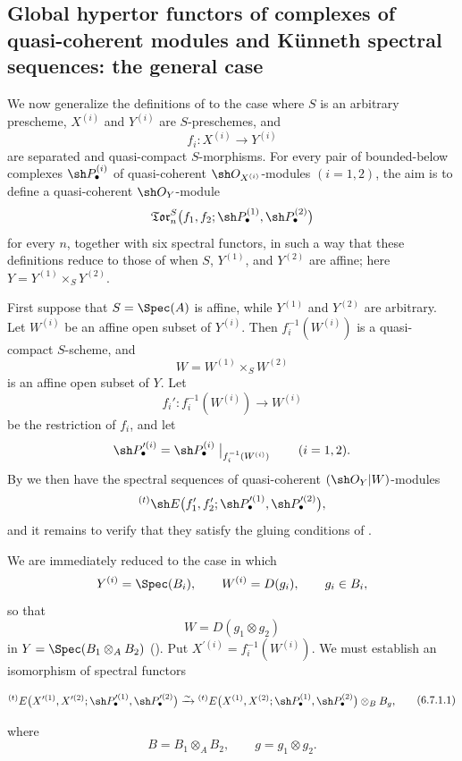 \subsection{Global hypertor functors of complexes of quasi-coherent modules and K\"unneth spectral sequences: the general case}
\label{subsection:III.6.7}

\begin{env}[6.7.1]
\label{III.6.7.1}
We now generalize the definitions of  to the
case where $S$ is an arbitrary prescheme, $X^{(i)}$ and
$Y^{(i)}$ are $S$-preschemes, and
\[
  f_i:X^{(i)}\longrightarrow Y^{(i)}
\]
are separated and quasi-compact $S$-morphisms.  For every pair
of bounded-below complexes $\sh P_\bullet^{(i)}$ of
quasi-coherent $\sh O_{X^{(i)}}$-modules $(i=1,2)$, the aim is to
define a quasi-coherent $\sh O_Y$-module
\[
  \mathfrak{Tor}_n^S
  \bigl(
    f_1,f_2;
    \sh P_\bullet^{(1)},\sh P_\bullet^{(2)}
  \bigr)
\]
for every $n$, together with six spectral functors, in such a way
that these definitions reduce to those of  when
$S$, $Y^{(1)}$, and $Y^{(2)}$ are affine; here
$Y=Y^{(1)}\times_SY^{(2)}$.

First suppose that $S=\Spec(A)$ is affine, while $Y^{(1)}$ and
$Y^{(2)}$ are arbitrary.  Let $W^{(i)}$ be an affine open subset
of $Y^{(i)}$.  Then $f_i^{-1}(W^{(i)})$ is a quasi-compact
$S$-scheme, and
\[
  W=W^{(1)}\times_SW^{(2)}
\]
is an affine open subset of $Y$.  Let
\[
  f_i':f_i^{-1}(W^{(i)})\longrightarrow W^{(i)}
\]
be the restriction of $f_i$, and let
\[
  \sh P_\bullet^{\prime(i)}
  =
  \sh P_\bullet^{(i)}
  \bigm|_{f_i^{-1}(W^{(i)})}
  \qquad(i=1,2).
\]
By  we then have the spectral sequences of
quasi-coherent $(\sh O_Y|W)$-modules
\[
  {}^{(t)}\sh E
  \bigl(
    f_1',f_2';
    \sh P_\bullet^{\prime(1)},\sh P_\bullet^{\prime(2)}
  \bigr),
\]
and it remains to verify that they satisfy the gluing conditions
of .

We are immediately reduced to the case in which
\[
  Y^{(i)}=\Spec(B_i),
  \qquad
  W^{(i)}=D(g_i),
  \qquad g_i\in B_i,
\]
so that
\[
  W=D(g_1\otimes g_2)
\]
in $Y=\Spec(B_1\otimes_AB_2)$
().  Put
$X^{\prime(i)}=f_i^{-1}(W^{(i)})$.  We must establish an
isomorphism of spectral functors
\begin{env}[6.7.1.1]
\label{III.6.7.1.1}
\[
\begin{split}
  {}^{(t)}E
  \bigl(
    X^{\prime(1)},X^{\prime(2)};
    \sh P_\bullet^{\prime(1)},\sh P_\bullet^{\prime(2)}
  \bigr)
  \xrightarrow{\sim}
  {}^{(t)}E
  \bigl(
    X^{(1)},X^{(2)};
    \sh P_\bullet^{(1)},\sh P_\bullet^{(2)}
  \bigr)
  \otimes_BB_g ,
\end{split}
\tag{6.7.1.1}\label{III.6.7.1.1.eq}
\]
\end{env}
where
\[
  B=B_1\otimes_AB_2,
  \qquad
  g=g_1\otimes g_2.
\]


\end{env}
